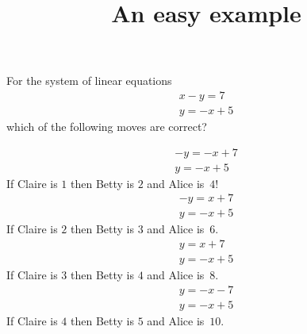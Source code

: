 \documentclass{webquiz}
\title{An easy example}
\begin{document}
\begin{question} %
For the system of linear equations
\begin{gather*} 
x-y=7\\
y=-x+5
\end{gather*}
which of the following moves are correct?
\begin{choice}[columns=2] %
\correct
\begin{gather*} 
-y=-x+7\\
y=-x+5
\end{gather*}
\feedback If Claire is $1$ then Betty is $2$ and Alice is~$4$!
\incorrect
\begin{gather*} 
-y=x+7\\
y=-x+5
\end{gather*}
\feedback If Claire is $2$ then Betty is $3$ and Alice is~$6$.
\incorrect
\begin{gather*} 
y=x+7\\
y=-x+5
\end{gather*}
\feedback If Claire is $3$ then Betty is $4$ and Alice is~$8$.
\incorrect
\begin{gather*} 
y=-x-7\\
y=-x+5
\end{gather*}
\feedback If Claire is $4$ then Betty is $5$ and Alice is~$10$.
\end{choice}
\end{question}
\end{document}
